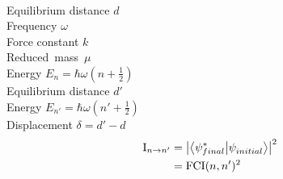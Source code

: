 \documentclass[12pt, fleqn]{beamer}
\begin{document}
\begin{frame}
\begin{overlayarea}{\textwidth}{10cm}
{\begin{figure}
            \end{figure}
            ~\\ 
            Equilibrium distance $d$ \\
            Frequency $\omega$ \\
            Force constant $k$ \\
            \mbox{Reduced mass $\mu$} \\
            Energy $E_n = \hbar \omega (n+\frac{1}{2})$ \\
            Equilibrium distance $d'$ \\
            Energy $E_{n'} = \hbar \omega (n'+\frac{1}{2})$ \\
            Displacement $\delta = d'-d$ \\ 
            \begin{align}
            \mathrm{I}_{n \to n'} &= \abs{\braket{\psi^{\ast}_{final}}{\psi^{}_{initial}}}^2 \nonumber \\
                                  &= \mathrm{FCI}(n,n')^2 \nonumber 
            \end{align}
        }
    \end{overlayarea}
\end{frame}
\end{document}
